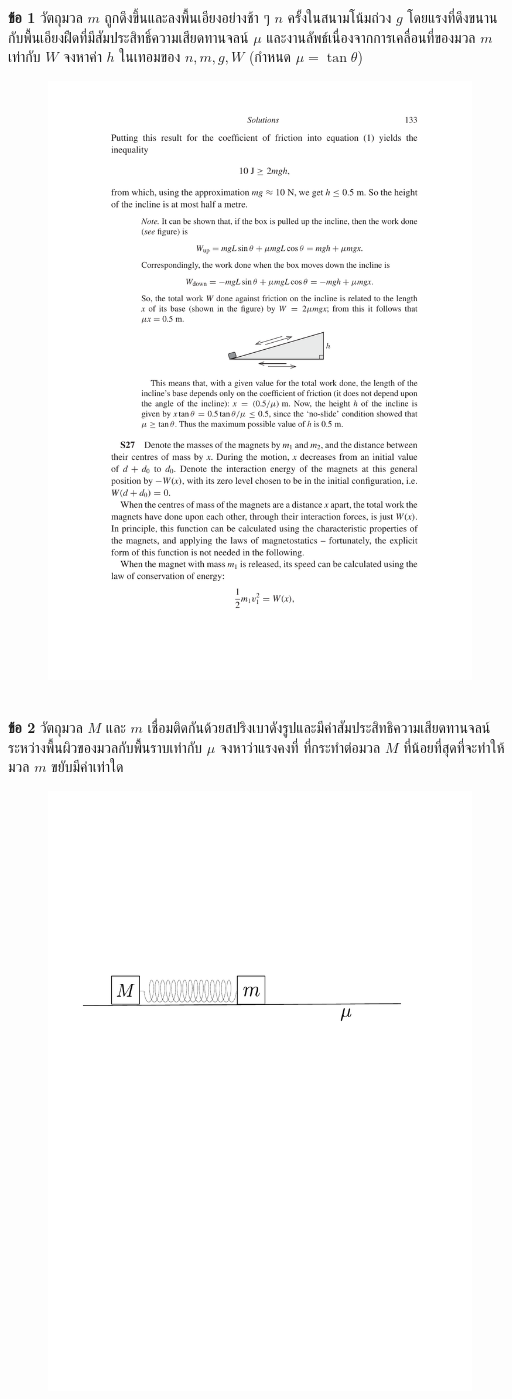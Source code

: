 \documentclass[a4paper,12pt]{article}
\begin{document}
\noindent\textbf{ข้อ 1} วัตถุมวล \(m\) ถูกดึงขึ้นและลงพื้นเอียงอย่างช้า ๆ \(n\) ครั้งในสนามโน้มถ่วง \(g\) โดยแรงที่ดึงขนานกับพื้นเอียงฝืดที่มีสัมประสิทธิ์ความเสียดทานจลน์ \(\mu\) และงานลัพธ์เนื่องจากการเคลื่อนที่ของมวล \(m\) เท่ากับ \(W\) จงหาค่า \(h\) ในเทอมของ \(n,m,g,W\) (กำหนด \(\mu=\tan\theta\))
\renewcommand{\thefootnote}{\fnsymbol{footnote}}
\begin{figure}[h]
	\centering
	\includegraphics[width=0.5\linewidth]{incline}
\end{figure}
\vspace{8cm}\\
\noindent \textbf{ข้อ 2} วัตถุมวล \(M\) และ \(m\) เชื่อมติดกันด้วยสปริงเบาดังรูปและมีค่าสัมประสิทธิความเสียดทานจลน์ระหว่างพื้นผิวของมวลกับพื้นราบเท่ากับ \(\mu\) จงหาว่าแรงคงที่ ที่กระทำต่อมวล \(M\) ที่น้อยที่สุดที่จะทำให้มวล \(m\) ขยับมีค่าเท่าใด
\begin{figure}[h]
	\centering
	\includegraphics[width=0.5\linewidth]{two_mass_with_spring}
\end{figure}
\newpage
\end{document}
